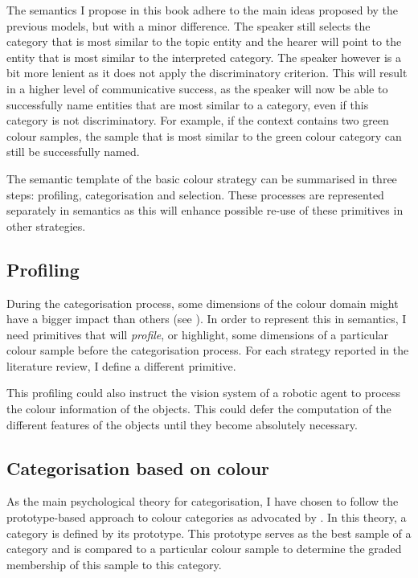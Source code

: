 The semantics I propose in this book adhere to the main ideas
proposed by the previous models, but with a minor difference. The
speaker still selects the category that is most similar to the topic
entity and the hearer will point to the entity that is most similar to
the interpreted category. The speaker however is a bit more lenient as
it does not apply the discriminatory criterion. This will result in a
higher level of communicative success, as the speaker will now be able
to successfully name entities that are most similar to a category,
even if this category is not discriminatory. For example, if the
context contains two green colour samples, the sample that is most \enlargethispage{\baselineskip}
similar to the green colour category can still be successfully
named. 

The semantic template of the basic colour strategy can be
summarised in three steps: profiling, categorisation and
selection. These processes are represented separately in semantics as
this will enhance possible re-use of these primitives in other
strategies.

\subsection{Profiling}

During the categorisation process, some dimensions of the colour
domain might have a bigger impact than others (see ). In order to represent this in
semantics, I need primitives that will \emph{profile}, or highlight,
some dimensions of a particular colour sample before the
categorisation process. For each strategy reported in the literature
review, I define a different primitive.

This profiling could also instruct the vision system of a robotic
agent to process the colour information of the objects. This could
defer the computation of the different features of the objects until
they become absolutely necessary.

\subsection{Categorisation based on colour}
\label{s:bcs-categorisation}

As the main psychological theory for categorisation, I have chosen to
follow the prototype-based approach to colour categories as advocated
by \cite{rosch73natural}. In this theory, a category is defined by its
prototype. This prototype serves as the best sample of a category and
is compared to a particular colour sample to determine the graded
membership of this sample to this category.

